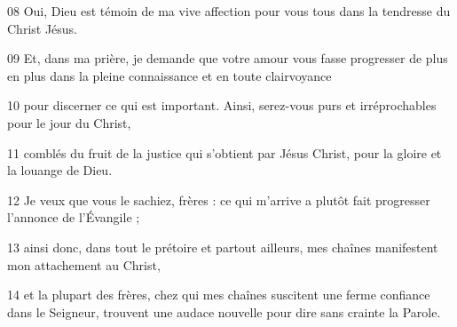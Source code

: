 
08 Oui, Dieu est témoin de ma vive affection pour vous tous dans la tendresse du Christ Jésus.

09 Et, dans ma prière, je demande que votre amour vous fasse progresser de plus en plus dans la pleine connaissance et en toute clairvoyance

10 pour discerner ce qui est important. Ainsi, serez-vous purs et irréprochables pour le jour du Christ,

11 comblés du fruit de la justice qui s’obtient par Jésus Christ, pour la gloire et la louange de Dieu.

12 Je veux que vous le sachiez, frères : ce qui m’arrive a plutôt fait progresser l’annonce de l’Évangile ;

13 ainsi donc, dans tout le prétoire et partout ailleurs, mes chaînes manifestent mon attachement au Christ,

14 et la plupart des frères, chez qui mes chaînes suscitent une ferme confiance dans le Seigneur, trouvent une audace nouvelle pour dire sans crainte la Parole.
